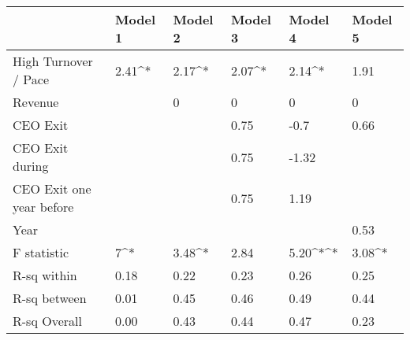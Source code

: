 \begin{table}[] \center
\caption{} 
\label{} 
\begin{tabular}{llllll}
& Model 1 & Model 2 & Model 3 & Model 4 & Model 5 \\
\hline
High Turnover / Pace		& 2.41^*  & 2.17^*  & 2.07^*  & 2.14^*  & 1.91      \\
Revenue       				&         & 0       & 0       & 0       & 0         \\
CEO Exit      				&         &         & 0.75    & -0.7    & 0.66      \\
CEO Exit during				&         &         & 0.75    & -1.32   &           \\
CEO Exit one year before	&         &         & 0.75    & 1.19    &           \\
Year						&         &         &         &         &  0.53     \\
F statistic   				& 7^*     & 3.48^*  &  2.84   & 5.20^*^*& 3.08^*    \\
R-sq within   				& 0.18    & 0.22    &  0.23   & 0.26    &  0.25     \\
R-sq between  				& 0.01    & 0.45    &  0.46   & 0.49    & 0.44      \\
R-sq Overall       			& 0.00    & 0.43    &  0.44   & 0.47    & 0.23      \\
\end{tabular}
\end{table}
